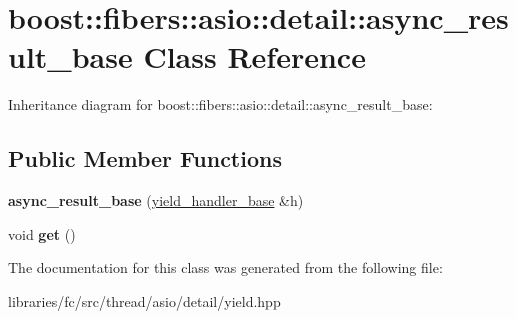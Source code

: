 \hypertarget{classboost_1_1fibers_1_1asio_1_1detail_1_1async__result__base}{}\section{boost\+:\+:fibers\+:\+:asio\+:\+:detail\+:\+:async\+\_\+result\+\_\+base Class Reference}
\label{classboost_1_1fibers_1_1asio_1_1detail_1_1async__result__base}


Inheritance diagram for boost\+:\+:fibers\+:\+:asio\+:\+:detail\+:\+:async\+\_\+result\+\_\+base\+:
\subsection*{Public Member Functions}
\begin{DoxyCompactItemize}
\item 
\mbox{\label{classboost_1_1fibers_1_1asio_1_1detail_1_1async__result__base_ac21ded5289f9a56f6c5477d9a3684a3c}} 
{\bfseries async\+\_\+result\+\_\+base} (\mbox{\hyperlink{classboost_1_1fibers_1_1asio_1_1detail_1_1yield__handler__base}{yield\+\_\+handler\+\_\+base}} \&h)
\item 
\mbox{\label{classboost_1_1fibers_1_1asio_1_1detail_1_1async__result__base_a5aadf61dad90a784b5623db1bfb19f38}} 
void {\bfseries get} ()
\end{DoxyCompactItemize}


The documentation for this class was generated from the following file\+:\begin{DoxyCompactItemize}
\item 
libraries/fc/src/thread/asio/detail/yield.\+hpp\end{DoxyCompactItemize}
